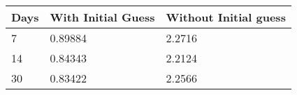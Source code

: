 \begin{tabular}{lll}
Days & With Initial Guess & Without Initial guess \\ 
\hline 
7 & 0.89884 & 2.2716 \\ 
14 & 0.84343 & 2.2124 \\ 
30 & 0.83422 & 2.2566 \\ 
\hline 
\end{tabular}